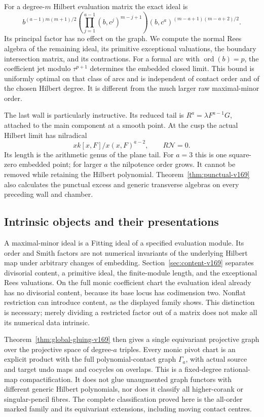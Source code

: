 \documentclass[11pt,reqno]{amsart}
\numberwithin{equation}{section}
\theoremstyle{definition}\newtheorem{definition}[theorem]{Definition}
\theoremstyle{remark}\newtheorem{remark}[theorem]{Remark}
\begin{document}
For a degree-$m$ Hilbert evaluation matrix the exact ideal is
\[
 b^{(a-1)m(m+1)/2}
 \left(\prod_{j=1}^{a-1}(b,c^j)^{m-j+1}\right)
 (b,c^a)^{(m-a+1)(m-a+2)/2}.
\]
Its principal factor has no effect on the graph. We compute the
normal Rees algebra of the remaining ideal, its primitive exceptional
valuations, the boundary intersection matrix, and its contractions.
For a formal arc with $\operatorname{ord}(b)=p$, the coefficient jet
modulo $\tau^{p+1}$ determines the embedded closed limit. This bound
is uniformly optimal on that class of arcs and is independent of
contact order and of the chosen Hilbert degree. It is different from
the much larger raw maximal-minor order.

The last wall is particularly instructive. Its reduced tail is
$R^a=\lambda F^{a-1}G$, attached to the main component at a smooth
point. At the cusp the actual Hilbert limit has nilradical
\[
 xk[x,F]/x(x,F)^{a-2},\qquad R\mathcal N=0.
\]
Its length is the arithmetic genus of the plane tail. For $a=3$ this
is one square-zero embedded point; for larger $a$ the nilpotence
order grows. It cannot be removed while retaining the Hilbert
polynomial. Theorem~\ref{thm:punctual-v169} also calculates the
punctual excess and generic transverse algebras on every preceding
wall and chamber.

\subsection{Intrinsic objects and their presentations}
A maximal-minor ideal is a Fitting ideal of a specified evaluation
module. Its order and Smith factors are not numerical invariants of
the underlying Hilbert map under arbitrary changes of embedding.
Section~\ref{sec:content-v169} separates divisorial content, a primitive
ideal, the finite-module length, and the exceptional Rees valuations.
On the full monic coefficient chart the evaluation ideal already has
no divisorial content, because its base locus has codimension two.
Nonflat restriction can introduce content, as the displayed family
shows. This distinction is necessary; merely dividing a restricted
factor out of a matrix does not make all its numerical data intrinsic.

Theorem~\ref{thm:global-gluing-v169} then gives a single equivariant
projective graph over the projective space of degree-$a$ triples.
Every monic pivot chart is an explicit product with the full
polynomial-contact graph $\Gamma_a$, with actual source and target
undo maps and cocycles on overlaps. This is a fixed-degree rational-map
compactification. It does not glue unaugmented graph functors with
different generic Hilbert polynomials, nor does it classify all
higher-corank or singular-pencil fibres. The complete classification
proved here is the all-order marked family and its equivariant
extensions, including moving contact centres.
\end{document}
